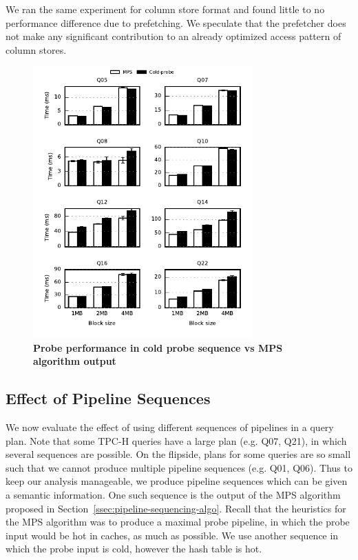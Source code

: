 We ran the same experiment for column store format and found little to no performance difference due to prefetching. 
We speculate that the prefetcher does not make any significant contribution to an already optimized access pattern of column stores.
\begin{figure}[ht]
	\centering 
	\includegraphics[width=0.75\textwidth]{pipeline/figures/first-probe-comparison-mps-vs-coldprobe-20threads-colstore-withlip}
	\caption{\textbf{Probe performance in cold probe sequence vs MPS algorithm output}}
	\label{fig:coldprobe-vs-mps}
\end{figure}

\subsection{Effect of Pipeline Sequences}
We now evaluate the effect of using different sequences of pipelines in a query plan. 
Note that some TPC-H queries have a large plan (e.g. Q07, Q21), in which several sequences are possible.
On the flipside, plans for some queries are so small such that we cannot produce multiple pipeline sequences (e.g. Q01, Q06).
Thus to keep our analysis manageable, we produce pipeline sequences which can be given a semantic information. 
One such sequence is the output of the MPS algorithm proposed in Section~\ref{ssec:pipeline-sequencing-algo}.
Recall that the heuristics for the MPS algorithm was to produce a maximal probe pipeline, in which the probe input would be hot in caches, as much as possible.
We use another sequence in which the probe input is cold, however the hash table is hot. 

